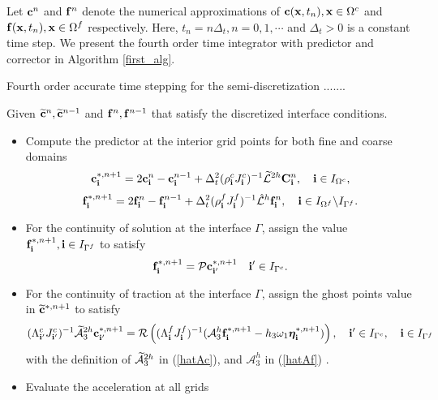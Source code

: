 Let ${\bf c}^{n}$ and ${\bf f}^{n}$ denote the numerical approximations of ${\bf c}({\bf x},t_n), {\bf x}\in\Omega^c$ and ${\bf f}({\bf x},t_n), {\bf x}\in\Omega^f$ respectively. Here, $t_n = n\Delta_t, n = 0,1,\cdots$ and $\Delta_t > 0$ is a constant time step. We present the fourth order time integrator with predictor and corrector in  Algorithm \ref{first_alg}.
~\\
\begin{breakablealgorithm}
	\caption{Fourth order accurate time stepping for the semi-discretization .......}\label{first_alg}
	Given  $\widetilde{{\bf c}}^{n}, \widetilde{{\bf c}}^{n-1}$ and ${\bf f}^{n}, {\bf f}^{n-1}$ that satisfy the discretized interface conditions.
	
	\begin{itemize}
		\item  {Compute the predictor at the interior grid points for both fine and coarse domains
			\[{\bf c}^{*,n+1}_{\bf i} = 2{\bf c}^{n}_{\bf i} - {\bf c}^{n-1}_{\bf i} + \Delta_t^2(\rho^{c}_{\bf i}J^c_{\bf i})^{-1}{\widetilde{\mathcal{L}}}^{2h} {\bf{C}}^{n}_{\bf i},\quad {\bf i}\in I_{\Omega^c},\]
			\[{\bf f}^{*,n+1}_{\bf i} = 2{\bf f}^{n}_{\bf i} - {\bf f}^{n-1}_{\bf i} + \Delta_t^2(\rho^f_{\bf i}J^f_{\bf i})^{-1}\hat{\mathcal{L}}^{h} {\bf{f}}^{n}_{\bf i},\quad {\bf i}\in I_{\Omega^f}\backslash I_{\Gamma^f}.\]
		}
		\item{For the continuity of solution at the interface $\Gamma$, assign the value ${\bf f}^{*,n+1}_{\bf i}, {\bf i}\in I_{\Gamma^f}$ to satisfy
			\begin{equation*}
			{\bf f}^{*,n+1}_{\bf i} = {\mathcal{P}}{\bf c}^{*,n+1}_{{\bf i}'} \quad {\bf i}'\in I_{\Gamma^c}.
			\end{equation*}
		}
		\item{For the continuity of traction at the interface $\Gamma$, assign the ghost points value in $\widetilde{\bf c}^{*,n+1}$ to satisfy
			\begin{equation}\label{traction_gamma_pre}
			({\Lambda}^{c}_{{\bf i}'}{J}_{{\bf i}'}^{c})^{-1}\wt{\mathcal{A}}_3^{2h}{\bf c}^{*,n+1}_{{\bf i}'}
			= {\mathcal{R}}\left(({\Lambda}^{f}_{\bf i}{J}^f_{\bf i})^{-1}(\mathcal{A}_3^h{\bf f}^{*,n+1}_{\bf i}-h_3\omega_1{\bm \eta}^{\ast,n+1}_{\bf i})\right),\quad {\bf i}'\in I_{\Gamma^c},\quad {\bf i}\in I_{\Gamma^f}
			\end{equation}
			with the definition of $\widetilde{\mathcal{A}}_3^{2h}$ in (\ref{hatAc}), and $\mathcal{A}_3^h$ in (\ref{hatAf}) .
		}
		\item{Evaluate the acceleration at all grids 
}
\end{itemize}
\end{breakablealgorithm}
